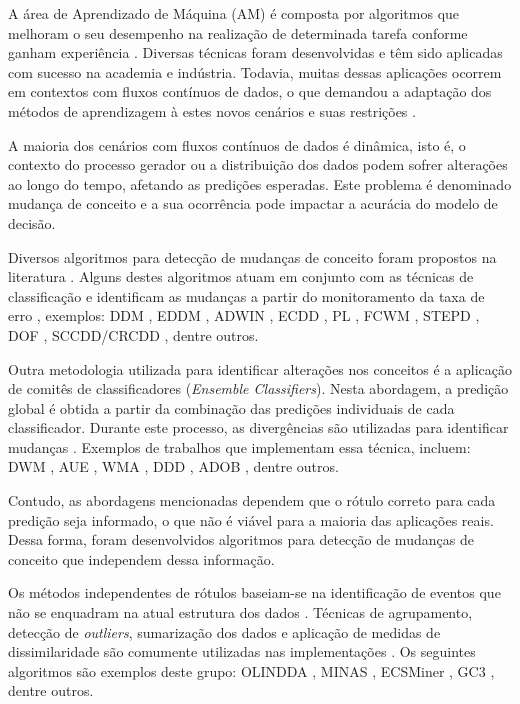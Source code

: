 \documentclass[qual, classic, a4paper]{ufbathesis}
\begin{document}
A área de Aprendizado de Máquina (AM) é composta por algoritmos que melhoram o seu desempenho na realização de determinada tarefa conforme ganham experiência \cite{Mitchell:1997:ML:541177}.
Diversas técnicas foram desenvolvidas e têm sido aplicadas com sucesso na academia e indústria.
Todavia, muitas dessas aplicações ocorrem em contextos com fluxos contínuos de dados, o que demandou a adaptação dos métodos de aprendizagem à estes novos cenários e suas restrições \cite{Bifet:2009:ALM:1656274.1656287}.

A maioria dos cenários com fluxos contínuos de dados é dinâmica, isto é, o contexto do processo gerador ou a distribuição dos dados podem sofrer alterações ao longo do tempo, afetando as predições esperadas.
Este problema é denominado mudança de conceito \cite{Gama:2010:KDD:1855075} e a sua ocorrência pode impactar a acurácia do modelo de decisão.

Diversos algoritmos para detecção de mudanças de conceito foram propostos na literatura \cite{Gama:2014:SCD:2597757.2523813}. 
Alguns destes algoritmos atuam em conjunto com as técnicas de classificação e identificam as mudanças a partir do monitoramento da taxa de erro \cite{Gama:2014:SCD:2597757.2523813}, 
exemplos: DDM \cite{GamaMCR04}, EDDM \cite{EDDM},  
ADWIN \cite{BifetG07}, ECDD \cite{Ross:2012:EWM:2076039.2076307}, 
PL \cite{Bach:PL:2008}, FCWM \cite{FCWM}, STEPD \cite{STEPD}, DOF \cite{Sobhani:2011:NDD:2045295.2045309}, 
SCCDD/CRCDD \cite{daCosta:2016:UDS:2956219.2956389}, dentre outros.

Outra metodologia utilizada para identificar alterações nos conceitos é a aplicação de comitês de classificadores (\textit{Ensemble Classifiers}). 
Nesta abordagem, a predição global é obtida a partir da combinação das predições individuais de cada classificador.
Durante este processo, as divergências são utilizadas para identificar mudanças \cite{Gama:2014:SCD:2597757.2523813}.
Exemplos de trabalhos que implementam essa técnica, incluem:
DWM \cite{Kolter:2007:DWM:1314498.1390333}, AUE \cite{AUE}, 
WMA \cite{Blum1997}, DDD \cite{Minku:2012:DNE:2197077.2197204}, ADOB \cite{deCarvalhoSantos:2014:SUR:3120352.3120365}, dentre outros.

Contudo, as abordagens mencionadas dependem que o rótulo correto para cada predição seja informado,
o que não é viável para a maioria das aplicações reais.
Dessa forma, foram desenvolvidos algoritmos para detecção de mudanças de conceito que independem dessa informação.

Os métodos independentes de rótulos baseiam-se na identificação de eventos que não se enquadram na atual estrutura dos dados \cite{Spinosa:2007:OCA:1244002.1244107}.
Técnicas de agrupamento, detecção de \textit{outliers}, sumarização dos dados e aplicação de medidas de dissimilaridade são comumente utilizadas nas implementações \cite{Ryu:Kantardzic:2012}.
Os seguintes algoritmos são exemplos deste grupo: 
OLINDDA \cite{Spinosa:2007:OCA:1244002.1244107},
MINAS \cite{Faria:2013:NDA:2480362.2480515},
ECSMiner \cite{Masud:2011:CNC:1978259.1978529},
GC3 \cite{Sethi2016b:GC3}, dentre outros.
\end{document}

